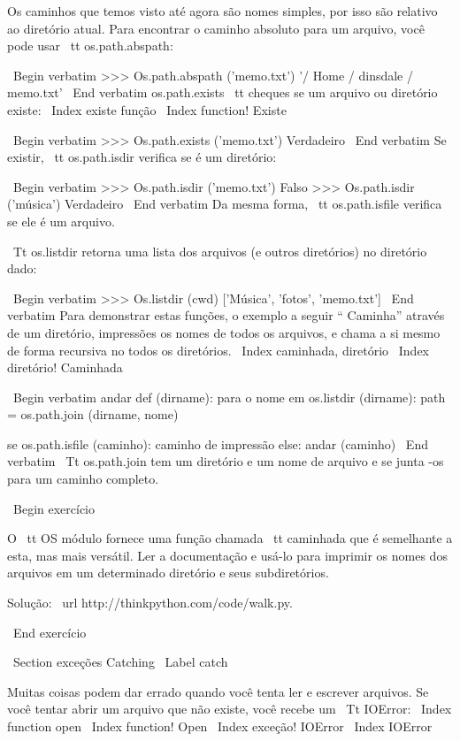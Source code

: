 \documentclass[10pt]{book}
\begin{document}
{{{{{{{{{{Os caminhos que temos visto até agora são nomes simples, por isso são
relativo ao diretório atual. Para encontrar o caminho absoluto para
um arquivo, você pode usar {\ tt os.path.abspath}:

\ Begin {verbatim}
>>> Os.path.abspath ('memo.txt')
'/ Home / dinsdale / memo.txt'
\ End {verbatim}
%
{os.path.exists \ tt} cheques
se um arquivo ou diretório existe:
\ Index {existe função}
\ Index {function! Existe}

\ Begin {verbatim}
>>> Os.path.exists ('memo.txt')
Verdadeiro
\ End {verbatim}
%
Se existir, {\ tt os.path.isdir} verifica se é um diretório:

\ Begin {verbatim}
>>> Os.path.isdir ('memo.txt')
Falso
>>> Os.path.isdir ('música')
Verdadeiro
\ End {verbatim}
%
Da mesma forma, {\ tt os.path.isfile} verifica se ele é um arquivo.

{\ Tt os.listdir} retorna uma lista dos arquivos (e outros diretórios)
no diretório dado:

\ Begin {verbatim}
>>> Os.listdir (cwd)
['Música', 'fotos', 'memo.txt']
\ End {verbatim}
%
Para demonstrar estas funções, o exemplo a seguir
`` Caminha'' através de um diretório, impressões
os nomes de todos os arquivos, e chama a si mesmo de forma recursiva no
todos os diretórios.
\ Index {caminhada, diretório}
\ Index {diretório! Caminhada}

\ Begin {verbatim}
andar def (dirname):
    para o nome em os.listdir (dirname):
        path = os.path.join (dirname, nome)

        se os.path.isfile (caminho):
            caminho de impressão
        else:
            andar (caminho)
\ End {verbatim}
%
{\ Tt os.path.join} tem um diretório e um nome de arquivo e se junta
-os para um caminho completo.  

\ Begin {} exercício

O {\ tt OS} módulo fornece uma função chamada {\ tt caminhada}
que é semelhante a esta, mas mais versátil. Ler
a documentação e usá-lo para imprimir os nomes dos
arquivos em um determinado diretório e seus subdiretórios.

Solução: \ url {http://thinkpython.com/code/walk.py}.

\ End {} exercício


\ Section {exceções Catching}
\ Label {catch}

Muitas coisas podem dar errado quando você tenta ler e escrever
arquivos. Se você tentar abrir um arquivo que não existe, você recebe um
{\ Tt IOError}:
\ Index {function open}
\ Index {function! Open}
\ Index {exceção! IOError}
\ Index {} IOError

}}}}}}}}}}
\end{document}
